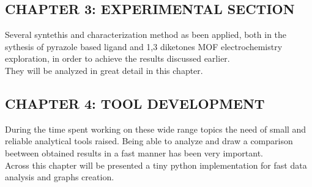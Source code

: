 \documentclass[a4,11pt]{report}
\begin{document}
\newline\subsection*{CHAPTER 3: EXPERIMENTAL SECTION}

Several syntethis and characterization method as been applied, both in the sythesis of pyrazole based ligand and 1,3 diketones MOF electrochemistry exploration, in order to achieve the results discussed earlier. \\
They will be analyzed in great detail in this chapter.

\newline\subsection*{CHAPTER 4: TOOL DEVELOPMENT}

During the time spent working on these wide range topics the need of small and reliable analytical tools raised. Being able to analyze and draw a comparison beetween obtained results in a fast manner has been very important. \\
Across this chapter will be presented a tiny python implementation for fast data analysis and graphs creation.

\newpage
\tableofcontents









\end{document}
